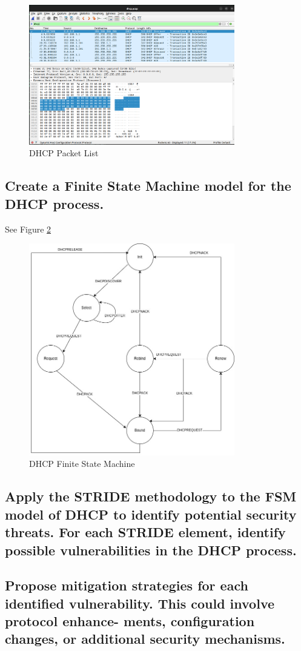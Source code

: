 \documentclass{article}
\begin{document}
\begin{figure}[h]
    \centering
    \includegraphics[width=0.8\textwidth]{task2/dhcp_wireshark.png}
    \caption{DHCP Packet List}
    \label{fig:pcap_dhcp}
\end{figure}


\subsection{Create a Finite State Machine model for the DHCP process.}
 
See Figure \ref{fig:dhcp_fsm}

\begin{figure}[h]
    \centering
    \includegraphics[width=0.8\textwidth]{task2/DHCP_FSM.jpg}
    \caption{DHCP Finite State Machine}
    \label{fig:dhcp_fsm}
\end{figure}

\subsection{Apply the STRIDE methodology to the FSM model of DHCP to identify potential security threats.
For each STRIDE element, identify possible vulnerabilities in the DHCP process.}

\subsection{Propose mitigation strategies for each identified vulnerability. This could involve protocol enhance-
ments, configuration changes, or additional security mechanisms.}
\end{document}
